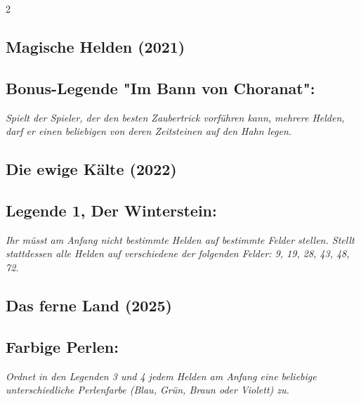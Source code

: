 \documentclass[10pt, a4paper, oneside]{book}
\newcommand{\fan}[1]{\textit{#1}}
\begin{document}
\begin{multicols*}{2}
\begin{bgcolor}[color-DZ]
\end{bgcolor}


\begin{nobgcolor}
\section{Magische Helden (2021)}

\subsection{Bonus-Legende "Im Bann von Choranat":}

\fan{Spielt der Spieler, der den besten Zaubertrick vorführen kann, mehrere Helden, darf er einen beliebigen von deren Zeitsteinen auf den Hahn legen.}

\end{nobgcolor}

\begin{bgcolor}
\section{Die ewige Kälte (2022)}



\subsection{Legende 1, Der Winterstein:}


\fan{Ihr müsst am Anfang nicht bestimmte Helden auf bestimmte Felder stellen. Stellt stattdessen alle Helden auf verschiedene der folgenden Felder: 9, 19, 28, 43, 48, 72.}

\end{bgcolor}



\begin{bgcolor}
\section{Das ferne Land (2025)}



\subsection{Farbige Perlen:} 

\fan{Ordnet in den Legenden 3 und 4 jedem Helden am Anfang eine beliebige unterschiedliche Perlenfarbe (Blau, Grün, Braun oder Violett) zu.}


\end{bgcolor}
\end{multicols*}
\end{document}
